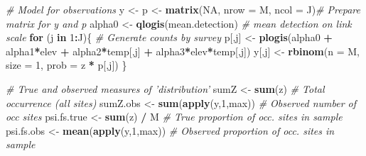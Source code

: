 \documentclass[
]{book}
\newenvironment{Shaded}{\begin{snugshade}}{\end{snugshade}}
\newcommand{\CommentTok}[1]{\textcolor[rgb]{0.56,0.35,0.01}{\textit{#1}}}
\newcommand{\ControlFlowTok}[1]{\textcolor[rgb]{0.13,0.29,0.53}{\textbf{#1}}}
\newcommand{\DataTypeTok}[1]{\textcolor[rgb]{0.13,0.29,0.53}{#1}}
\newcommand{\DecValTok}[1]{\textcolor[rgb]{0.00,0.00,0.81}{#1}}
\newcommand{\KeywordTok}[1]{\textcolor[rgb]{0.13,0.29,0.53}{\textbf{#1}}}
\newcommand{\NormalTok}[1]{#1}
\newcommand{\OperatorTok}[1]{\textcolor[rgb]{0.81,0.36,0.00}{\textbf{#1}}}
\newcommand{\OtherTok}[1]{\textcolor[rgb]{0.56,0.35,0.01}{#1}}
\newcommand{\StringTok}[1]{\textcolor[rgb]{0.31,0.60,0.02}{#1}}
\begin{document}
\begin{Shaded}
\begin{Highlighting}[]
\CommentTok{# Model for observations}
\NormalTok{y <-}\StringTok{ }\NormalTok{p <-}\StringTok{ }\KeywordTok{matrix}\NormalTok{(}\OtherTok{NA}\NormalTok{, }\DataTypeTok{nrow =}\NormalTok{ M, }\DataTypeTok{ncol =}\NormalTok{ J)}\CommentTok{# Prepare matrix for y and p}
\NormalTok{alpha0 <-}\StringTok{ }\KeywordTok{qlogis}\NormalTok{(mean.detection)        }\CommentTok{# mean detection on link scale}
\ControlFlowTok{for}\NormalTok{ (j }\ControlFlowTok{in} \DecValTok{1}\OperatorTok{:}\NormalTok{J)\{                         }\CommentTok{# Generate counts by survey}
\NormalTok{   p[,j] <-}\StringTok{ }\KeywordTok{plogis}\NormalTok{(alpha0 }\OperatorTok{+}\StringTok{ }\NormalTok{alpha1}\OperatorTok{*}\NormalTok{elev }\OperatorTok{+}\StringTok{ }\NormalTok{alpha2}\OperatorTok{*}\NormalTok{temp[,j] }\OperatorTok{+}\StringTok{ }\NormalTok{alpha3}\OperatorTok{*}\NormalTok{elev}\OperatorTok{*}\NormalTok{temp[,j])}
\NormalTok{   y[,j] <-}\StringTok{ }\KeywordTok{rbinom}\NormalTok{(}\DataTypeTok{n =}\NormalTok{ M, }\DataTypeTok{size =} \DecValTok{1}\NormalTok{, }\DataTypeTok{prob =}\NormalTok{ z }\OperatorTok{*}\StringTok{ }\NormalTok{p[,j])}
\NormalTok{\}}

\CommentTok{# True and observed measures of 'distribution'}
\NormalTok{sumZ <-}\StringTok{ }\KeywordTok{sum}\NormalTok{(z)                     }\CommentTok{# Total occurrence (all sites)}
\NormalTok{sumZ.obs <-}\StringTok{ }\KeywordTok{sum}\NormalTok{(}\KeywordTok{apply}\NormalTok{(y,}\DecValTok{1}\NormalTok{,max))    }\CommentTok{# Observed number of occ sites}
\NormalTok{psi.fs.true <-}\StringTok{ }\KeywordTok{sum}\NormalTok{(z) }\OperatorTok{/}\StringTok{ }\NormalTok{M          }\CommentTok{# True proportion of occ. sites in sample}
\NormalTok{psi.fs.obs <-}\StringTok{ }\KeywordTok{mean}\NormalTok{(}\KeywordTok{apply}\NormalTok{(y,}\DecValTok{1}\NormalTok{,max)) }\CommentTok{# Observed proportion of occ. sites in sample}


\end{Highlighting}
\end{Shaded}
\end{document}
